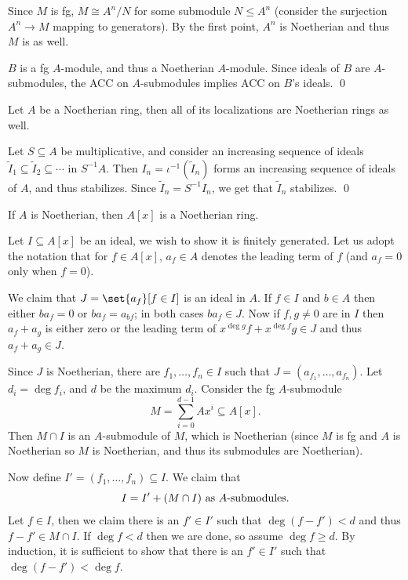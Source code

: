     Since $M$ is fg, $M\cong A^n/N$ for some submodule $N\leq A^n$ (consider the surjection $A^n\to M$ mapping to generators).
    By the first point, $A^n$ is Noetherian and thus $M$ is as well.

    $B$ is a fg $A$-module, and thus a Noetherian $A$-module.
    Since ideals of $B$ are $A$-submodules, the ACC on $A$-submodules implies ACC on $B$'s ideals.
    \qed

\eproof

\blemm

    Let $A$ be a Noetherian ring, then all of its localizations are Noetherian rings as well.

\elemm

\bproof

    Let $S\subseteq A$ be multiplicative, and consider an increasing sequence of ideals $\tilde I_1\subseteq\tilde I_2\subseteq\cdots$ in $S^{-1}A$.
    Then $I_n=\iota^{-1}(\tilde I_n)$ forms an increasing sequence of ideals of $A$, and thus stabilizes.
    Since $\tilde I_n=S^{-1}I_n$, we get that $\tilde I_n$ stabilizes.
    \qed

\eproof

\bthrm[title=Hilbert basis theorem]

    If $A$ is Noetherian, then $A[x]$ is a Noetherian ring.

\ethrm

\bproof

    Let $I\subseteq A[x]$ be an ideal, we wish to show it is finitely generated.
    Let us adopt the notation that for $f\in A[x]$, $a_f\in A$ denotes the leading term of $f$ (and $a_f=0$ only when $f=0$).

    We claim that $J=\set{a_f}[f\in I]$ is an ideal in $A$.
    If $f\in I$ and $b\in A$ then either $ba_f=0$ or $ba_f=a_{bf}$; in both cases $ba_f\in J$.
    Now if $f,g\neq0$ are in $I$ then $a_f+a_g$ is either zero or the leading term of $x^{\deg g}f+x^{\deg f}g\in J$ and thus $a_f+a_g\in J$.

    Since $J$ is Noetherian, there are $f_1,\dots,f_n\in I$ such that $J=(a_{f_1},\dots,a_{f_n})$.
    Let $d_i=\deg f_i$, and $d$ be the maximum $d_i$.
    Consider the fg $A$-submodule
    $$ M = \sum_{i=0}^{d-1}Ax^i \subseteq A[x] . $$
    Then $M\cap I$ is an $A$-submodule of $M$, which is Noetherian (since $M$ is fg and $A$ is Noetherian so $M$ is Noetherian, and thus its submodules are Noetherian).

    Now define $I'=(f_1,\dots,f_n)\subseteq I$.
    We claim that
    $$ I = I' + (M\cap I)\hbox{ as $A$-submodules} . $$
    Let $f\in I$, then we claim there is an $f'\in I'$ such that $\deg(f-f')<d$ and thus $f-f'\in M\cap I$.
    If $\deg f<d$ then we are done, so assume $\deg f\geq d$.
    By induction, it is sufficient to show that there is an $f'\in I'$ such that $\deg(f-f')<\deg f$.

